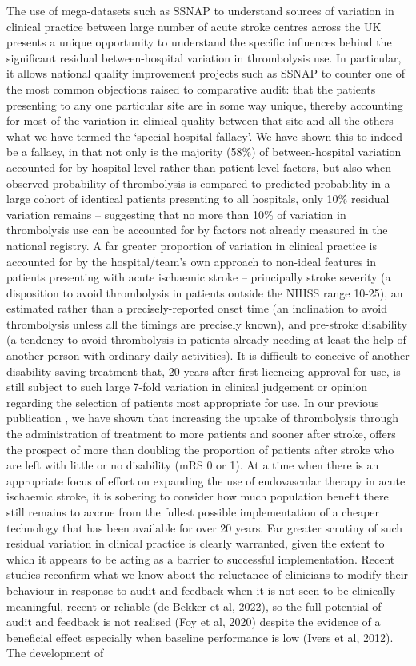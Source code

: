 The use of mega-datasets such as SSNAP to understand sources of variation in clinical practice between large number of acute stroke centres across the UK presents a unique opportunity to understand the specific influences behind the significant residual between-hospital variation in thrombolysis use.  In particular, it allows national quality improvement projects such as SSNAP to counter one of the most common objections raised to comparative audit: that the patients presenting to any one particular site are in some way unique, thereby accounting for most of the variation in clinical quality between that site and all the others – what we have termed the ‘special hospital fallacy’. We have shown this to indeed be a fallacy, in that not only is the majority (58\%) of between-hospital variation accounted for by hospital-level rather than patient-level factors, but also when observed probability of thrombolysis is compared to predicted probability in a large cohort of identical patients presenting to all hospitals, only 10\% residual variation remains – suggesting that no more than 10\% of variation in thrombolysis use can be accounted for by factors not already measured in the national registry. A far greater proportion of variation in clinical practice is accounted for by the hospital/team’s own approach to non-ideal features in patients presenting with acute ischaemic stroke – principally stroke severity (a disposition to avoid thrombolysis in patients outside the NIHSS range 10-25), an estimated rather than a precisely-reported onset time (an inclination to avoid thrombolysis unless all the timings are precisely known), and pre-stroke disability (a tendency to avoid thrombolysis in patients already needing at least the help of another person with ordinary daily activities). It is difficult to conceive of another disability-saving treatment that, 20 years after first licencing approval for use, is still subject to such large 7-fold variation in clinical judgement or opinion regarding the selection of patients most appropriate for use. In our previous publication \cite{allen_using_2022}, we have shown that increasing the uptake of thrombolysis through the administration of treatment to more patients and sooner after stroke, offers the prospect of more than doubling the proportion of patients after stroke who are left with little or no disability (mRS 0 or 1). At a time when there is an appropriate focus of effort on expanding the use of endovascular therapy in acute ischaemic stroke, it is sobering to consider how much population benefit there still remains to accrue from the fullest possible implementation of a cheaper technology that has been available for over 20 years. Far greater scrutiny of such residual variation in clinical practice is clearly warranted, given the extent to which it appears to be acting as a barrier to successful implementation. Recent studies reconfirm what we know about the reluctance of clinicians to modify their behaviour in response to audit and feedback when it is not seen to be clinically meaningful, recent or reliable (de Bekker et al, 2022), so the full potential of audit and feedback is not realised (Foy et al, 2020) despite the evidence of a beneficial effect especially when baseline performance is low (Ivers et al, 2012). The development of 